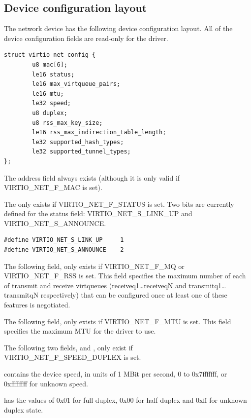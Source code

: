 \subsection{Device configuration layout}\label{sec:Device Types / Network Device / Device configuration layout}
\label{sec:Device Types / Block Device / Feature bits / Device configuration layout}

The network device has the following device configuration layout.
All of the device configuration fields are read-only for the driver.

\begin{lstlisting}
struct virtio_net_config {
        u8 mac[6];
        le16 status;
        le16 max_virtqueue_pairs;
        le16 mtu;
        le32 speed;
        u8 duplex;
        u8 rss_max_key_size;
        le16 rss_max_indirection_table_length;
        le32 supported_hash_types;
        le32 supported_tunnel_types;
};
\end{lstlisting}

The  address field always exists (although it is only
valid if VIRTIO_NET_F_MAC is set).

The  only exists if VIRTIO_NET_F_STATUS is set.
Two bits are currently defined for the status field: VIRTIO_NET_S_LINK_UP
and VIRTIO_NET_S_ANNOUNCE.

\begin{lstlisting}
#define VIRTIO_NET_S_LINK_UP     1
#define VIRTIO_NET_S_ANNOUNCE    2
\end{lstlisting}

The following field,  only exists if
VIRTIO_NET_F_MQ or VIRTIO_NET_F_RSS is set. This field specifies the maximum number
of each of transmit and receive virtqueues (receiveq1\ldots receiveqN
and transmitq1\ldots transmitqN respectively) that can be configured once at least one of these features
is negotiated.

The following field,  only exists if VIRTIO_NET_F_MTU
is set. This field specifies the maximum MTU for the driver to
use.

The following two fields,  and , only
exist if VIRTIO_NET_F_SPEED_DUPLEX is set.

 contains the device speed, in units of 1 MBit per
second, 0 to 0x7fffffff, or 0xffffffff for unknown speed.

 has the values of 0x01 for full duplex, 0x00 for
half duplex and 0xff for unknown duplex state.

